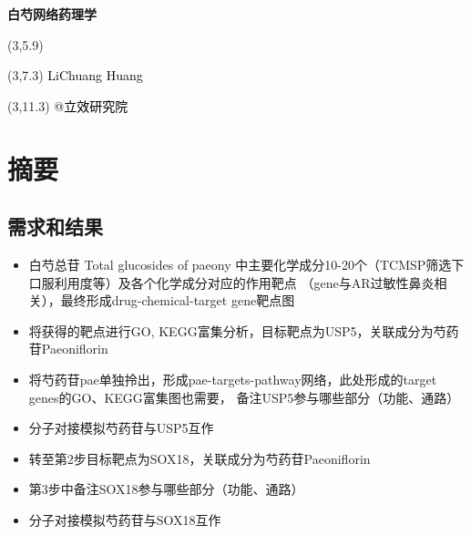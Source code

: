 \documentclass[
]{article}
\author{}
\date{\vspace{-2.5em}}
\providecommand{\tightlist}{%
  \setlength{\itemsep}{0pt}\setlength{\parskip}{0pt}}
\begin{document}
\begin{titlepage} 
\begin{center} \textbf{\Huge 白芍网络药理学}
\vspace{4em} \begin{textblock}{10}(3,5.9) \huge
\textbf{\textcolor{white}{2024-01-04}}
\end{textblock} \begin{textblock}{10}(3,7.3)
\Large \textcolor{black}{LiChuang Huang}
\end{textblock} \begin{textblock}{10}(3,11.3)
\Large \textcolor{black}{@立效研究院}
\end{textblock} \end{center} \end{titlepage}
\restoregeometry


\tableofcontents

\listoffigures

\listoftables

\newpage


\hypertarget{abstract}{%
\section{摘要}\label{abstract}}

\hypertarget{ux9700ux6c42ux548cux7ed3ux679c}{%
\subsection{需求和结果}\label{ux9700ux6c42ux548cux7ed3ux679c}}

\begin{itemize}
\tightlist
\item
  白芍总苷 Total glucosides of paeony 中主要化学成分10-20个（TCMSP筛选下口服利用度等）及各个化学成分对应的作用靶点
  （gene与AR过敏性鼻炎相关），最终形成drug-chemical-target gene靶点图
\item
  将获得的靶点进行GO, KEGG富集分析，目标靶点为USP5，关联成分为芍药苷Paeoniflorin
\item
  将芍药苷pae单独拎出，形成pae-targets-pathway网络，此处形成的target genes的GO、KEGG富集图也需要，
  备注USP5参与哪些部分（功能、通路）
\item
  分子对接模拟芍药苷与USP5互作
\item
  转至第2步目标靶点为SOX18，关联成分为芍药苷Paeoniflorin
\item
  第3步中备注SOX18参与哪些部分（功能、通路）
\item
  分子对接模拟芍药苷与SOX18互作
\end{itemize}
\end{document}
